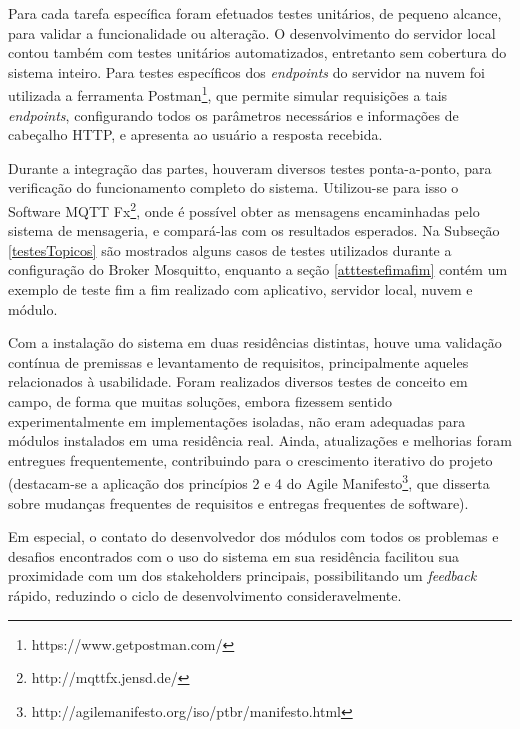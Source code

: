 Para cada tarefa específica foram efetuados testes unitários, de pequeno alcance, para validar a funcionalidade ou alteração. O desenvolvimento do servidor local contou também com testes unitários automatizados, entretanto sem cobertura do sistema inteiro. Para testes específicos dos \emph{endpoints} do servidor na nuvem foi utilizada a ferramenta Postman\footnote{https://www.getpostman.com/}, que permite simular requisições a tais \emph{endpoints}, configurando todos os parâmetros necessários e informações de cabeçalho HTTP, e apresenta ao usuário a resposta recebida.

Durante a integração das partes, houveram diversos testes ponta-a-ponto, para verificação do funcionamento completo do sistema. Utilizou-se para isso o Software MQTT Fx\footnote{http://mqttfx.jensd.de/}, onde é possível obter as mensagens encaminhadas pelo sistema de mensageria, e compará-las com os resultados esperados. Na Subseção \ref{testesTopicos} são mostrados alguns casos de testes utilizados durante a configuração do Broker Mosquitto, enquanto a seção \ref{atttestefimafim} contém um exemplo de teste fim a fim realizado com aplicativo, servidor local, nuvem e módulo.

Com a instalação do sistema em duas residências distintas, houve uma validação contínua de premissas e levantamento de requisitos, principalmente aqueles relacionados à usabilidade. Foram realizados diversos testes de conceito em campo, de forma que muitas soluções, embora fizessem sentido experimentalmente em implementações isoladas, não eram adequadas para módulos instalados em uma residência real. Ainda, atualizações e melhorias foram entregues frequentemente, contribuindo para o crescimento iterativo do projeto (destacam-se a aplicação dos princípios 2 e 4 do Agile Manifesto\footnote{http://agilemanifesto.org/iso/ptbr/manifesto.html}, que disserta sobre mudanças frequentes de requisitos e entregas frequentes de software).

Em especial, o contato do desenvolvedor dos módulos com todos os problemas e desafios encontrados com o uso do sistema em sua residência facilitou sua proximidade com um dos stakeholders principais, possibilitando um \textit{feedback} rápido, reduzindo o ciclo de desenvolvimento consideravelmente.